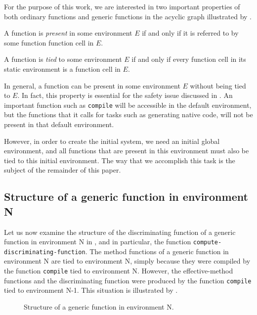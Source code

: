 For the purpose of this work, we are interested in two important
properties of both ordinary functions and generic functions in the
acyclic graph illustrated by .

\begin{definition}
A function is \emph{present} in some environment $E$ if and only if it
is referred to by some function function cell in $E$.
\end{definition}

\begin{definition}
A function is \emph{tied} to some environment $E$ if and only if every
function cell in its static environment is a function cell in $E$.
\end{definition}

In general, a function can be present in some environment $E$ without
being tied to $E$.  In fact, this property is essential for the safety
issue discussed in .  An
important function such as \texttt{compile} will be accessible in the
default environment, but the functions that it calls for tasks such as
generating native code, will not be present in that default
environment.

However, in order to create the initial \sicl{} system, we need an
initial global environment, and all functions that are present in this
environment must also be tied to this initial environment.  The way
that we accomplish this task is the subject of the remainder of this
paper.

\subsection{Structure of a generic function in environment N}

Let us now examine the structure of the discriminating function of a
generic function in environment N in , and
in particular, the function \texttt{compute-discriminating-function}.
The method functions of a generic function in environment N are tied
to environment N, simply because they were compiled by the function
\texttt{compile} tied to environment N.  However, the effective-method
functions and the discriminating function were produced by the
function \texttt{compile} tied to environment N-1.  This situation is
illustrated by .

\begin{figure}
\begin{center}
\end{center}
\caption{\label{fig-structure-of-generic-function}
Structure of a generic function in environment N.}
\end{figure}


